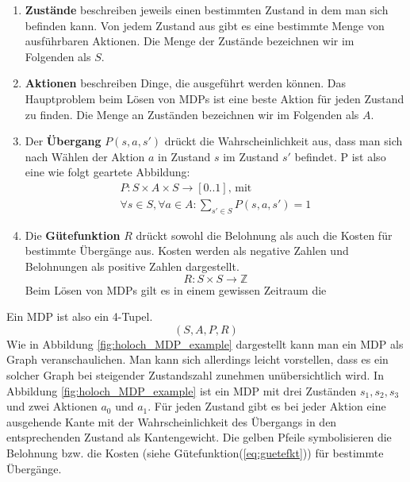 \documentclass[a4paper]{IEEEtran}
\begin{document}
\begin{enumerate}
	\item \textbf{Zustände} beschreiben jeweils einen bestimmten Zustand in dem man sich befinden kann. Von jedem Zustand aus gibt es eine bestimmte Menge von ausführbaren Aktionen. Die Menge der Zustände bezeichnen wir im Folgenden als $S$. %
	\item \textbf{Aktionen} beschreiben Dinge, die ausgeführt werden können. Das Hauptproblem beim Lösen von MDPs ist eine beste Aktion für jeden Zustand zu finden. Die Menge an Zuständen bezeichnen wir im Folgenden als $A$.
	\item Der \textbf{Übergang} $P(s, a, s')$ drückt die Wahrscheinlichkeit aus, dass man sich nach Wählen der Aktion $a$ in Zustand $s$ im Zustand $s'$ befindet. P ist also eine wie folgt geartete Abbildung:	
	\begin{equation}
		\begin{split}
			P: S \times A \times S \rightarrow [0..1] \text{, mit} \\
			\forall s \in S, \forall a \in A: \sum_{s' \in S} P(s, a, s') = 1
		\end{split}
	\end{equation} %
	\item Die \textbf{Gütefunktion} $R$ drückt sowohl die Belohnung als auch die Kosten für bestimmte Übergänge aus. Kosten werden als negative Zahlen und Belohnungen als positive Zahlen dargestellt.
	\begin{equation}
		R: S \times S \rightarrow \mathbb{Z}
		\label{eq:guetefkt}
	\end{equation}
	Beim Lösen von MDPs gilt es in einem gewissen Zeitraum die 
\end{enumerate}
Ein MDP ist also ein 4-Tupel.
\begin{equation}
	(S, A, P, R)
\end{equation}
Wie in Abbildung \ref{fig:holoch_MDP_example} dargestellt kann man ein MDP als Graph veranschaulichen. Man kann sich allerdings leicht vorstellen, dass es ein solcher Graph bei steigender Zustandszahl zunehmen unübersichtlich wird.
In Abbildung \ref{fig:holoch_MDP_example} ist ein MDP mit drei Zuständen $s_1, s_2, s_3$ und zwei Aktionen $a_0$ und $a_1$. Für jeden Zustand gibt es bei jeder Aktion eine ausgehende Kante mit der Wahrscheinlichkeit des Übergangs in den entsprechenden Zustand als Kantengewicht. Die gelben Pfeile symbolisieren die Belohnung bzw. die Kosten (siehe Gütefunktion(\ref{eq:guetefkt})) für bestimmte Übergänge.
\end{document}
